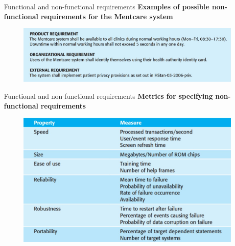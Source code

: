 \documentclass{beamer}
\begin{document}
\begin{frame}{Functional and non-functional requirements}
	\textbf{Examples of 
		possible non-functional 
		requirements for the 
		Mentcare system}
		\begin{figure}
		\includegraphics[scale=.4]{img/m2_3.jpg}
	\end{figure}

\end{frame}
\begin{frame}{Functional and non-functional requirements}
	\textbf{ Metrics for specifying non-functional requirements}
	\begin{figure}
		\includegraphics[scale=.5]{img/m2_4.jpg}
	\end{figure}
	
\end{frame}
\end{document}
